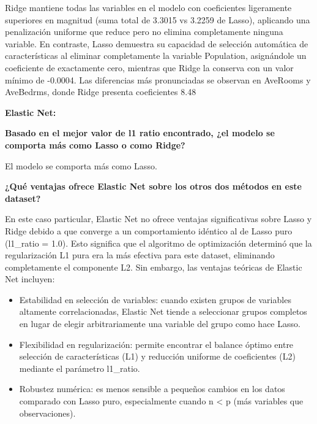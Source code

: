 \documentclass[12pt,a4paper]{article}
\begin{document}
Ridge mantiene todas las variables en el modelo con coeficientes ligeramente superiores en magnitud (suma total de 3.3015 vs 3.2259 de Lasso), aplicando una penalización uniforme que reduce pero no elimina completamente ninguna variable. En contraste, Lasso demuestra su capacidad de selección automática de características al eliminar completamente la variable Population, asignándole un coeficiente de exactamente cero, mientras que Ridge la conserva con un valor mínimo de -0.0004. Las diferencias más pronunciadas se observan en AveRooms y AveBedrms, donde Ridge presenta coeficientes 8.48%

\vspace{0.5cm}

\textbf{Elastic Net:}

\vspace{0.3cm}

\textbf{Basado en el mejor valor de l1 ratio encontrado, ¿el modelo se comporta más como Lasso o como
Ridge?}

El modelo se comporta más como Lasso.

\vspace{0.3cm}

\textbf{¿Qué ventajas ofrece Elastic Net sobre los otros dos métodos en este dataset?}

En este caso particular, Elastic Net no ofrece ventajas significativas sobre Lasso y Ridge debido a que converge a un comportamiento idéntico al de Lasso puro (l1\_ratio = 1.0). Esto significa que el algoritmo de optimización determinó que la regularización L1 pura era la más efectiva para este dataset, eliminando completamente el componente L2. Sin embargo, las ventajas teóricas de Elastic Net incluyen: 

\begin{itemize}
\item Estabilidad en selección de variables: cuando existen grupos de variables altamente correlacionadas, Elastic Net tiende a seleccionar grupos completos en lugar de elegir arbitrariamente una variable del grupo como hace Lasso.
\item Flexibilidad en regularización: permite encontrar el balance óptimo entre selección de características (L1) y reducción uniforme de coeficientes (L2) mediante el parámetro l1\_ratio.
\item Robustez numérica: es menos sensible a pequeños cambios en los datos comparado con Lasso puro, especialmente cuando n < p (más variables que observaciones). 
\end{itemize}
\end{document}
